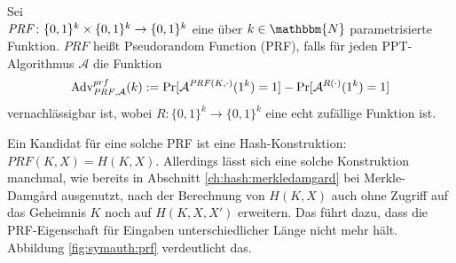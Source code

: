 \begin{definition}
Sei\\ 
$\text{\textit{PRF}}\colon\{0,1\}^k \times \{0, 1\}^k \rightarrow \{0,1\}^k$
eine über $k \in \mathbbm{N}$ parametrisierte Funktion. $PRF$ heißt Pseudorandom Function (PRF), falls für jeden PPT-Algorithmus $\mathcal{A}$ die Funktion
\begin{equation*}
\text{Adv}_{\text{\textit{PRF}},\mathcal{A}}^{prf}(k) := \Pr \lbrack \mathcal{A}^{\text{\textit{PRF}}(K,\cdot)}(1^k) = 1 \rbrack - \Pr \lbrack \mathcal{A}^{R(\cdot)}(1^k) = 1 \rbrack
\end{equation*}
vernachlässigbar ist, wobei $R: \{0,1\}^k \rightarrow \{0,1\}^k$ eine echt zufällige Funktion ist.~\\
\end{definition}

Ein Kandidat für eine solche PRF ist eine Hash-Konstruktion: $PRF(K,X) = H(K,X)$. Allerdings lässt sich eine solche Konstruktion manchmal, wie bereits in
Abschnitt \ref{ch:hash:merkledamgard} bei Merkle-Damgård ausgenutzt, nach der Berechnung von $H(K,X)$ auch ohne Zugriff auf das Geheimnis $K$ noch auf
$H(K,X,X')$ erweitern. Das führt dazu, dass die PRF-Eigenschaft für Eingaben unterschiedlicher Länge nicht mehr hält. Abbildung \ref{fig:symauth:prf} verdeutlicht das.

